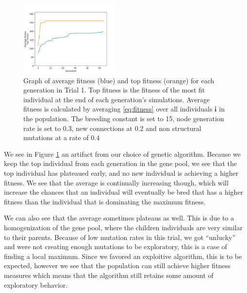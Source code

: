 \documentclass{article}
\begin{document}
\begin{figure}[h]\label{fig:fitness graph}
\centering
\includegraphics[width=0.45\textwidth]{fig_1}
\begin{changemargin}{0.15in}{0.15in}
  \caption{Graph of average fitness (blue) and top fitness (orange) for each
    generation in Trial 1. Top fitness is the fitness of the most fit individual
    at the end of each generation's simulations. Average fitness is calculated
    by averaging \eqref{eq:fitness} over all individuals $\bm{i}$ in the
    population. The breeding constant is set to 15, node generation rate is set
    to 0.3, new connections at 0.2 and non structural mutations at a rate of
    0.4}
\end{changemargin}
\end{figure}

We see in Figure \ref{fig:fitness graph} an artifact from our choice of genetic
algorithm. Because we keep the top individual from each generation in the gene
pool, we see that the top individual has plateaued early, and no new individual
is achieving a higher fitness. We see that the average is continually increasing
though, which will increase the chances that an individual will eventually be
bred that has a higher fitness than the individual that is dominating the
maximum fitness.

We can also see that the average sometimes plateaus as well. This is due to a
homogenization of the gene pool, where the children individuals are very
similar to their parents. Because of low mutation rates in this trial, we got
``unlucky'' and were not creating enough mutations to be exploratory, this is a
case of finding a local maximum. Since we favored an exploitive algorithm, this
is to be expected, however we see that the population can still achieve higher
fitness measures which means that the algorithm still retains some amount of
exploratory behavior.
\end{document}
